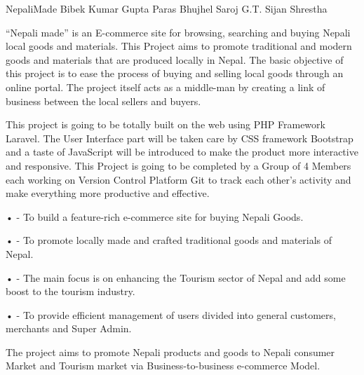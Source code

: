  \begin{conf-abstract}[]
 {NepaliMade}
 {Bibek Kumar Gupta
 	Paras Bhujhel
 	Saroj G.T.
 	Sijan Shrestha
 }
{}

“Nepali made” is an E-commerce site for browsing, searching and buying Nepali local goods and materials. This Project aims to promote traditional and modern goods and materials that are produced locally in Nepal. The basic objective of this project is to ease the process of buying and selling local goods through an online portal. The project itself acts as a middle-man by creating a link of business between the local sellers and buyers. 

This project is going to be totally built on the web using PHP Framework Laravel. The User Interface part will be taken care by CSS framework Bootstrap and a taste of JavaScript will be introduced to make the product more interactive and responsive. This Project is going to be completed by a Group of 4 Members each working on Version Control Platform Git to track each other’s activity and make everything more productive and effective. 

•    - To build a feature-rich e-commerce site for buying Nepali Goods.

•    - To promote locally made and crafted traditional goods and materials of Nepal.

•    - The main focus is on enhancing the Tourism sector of Nepal and add some boost to the tourism industry.

•    - To provide efficient management of users divided into general customers, merchants and Super Admin.

The project aims to promote Nepali products and goods to Nepali consumer Market and Tourism market via Business-to-business e-commerce Model.
\end{conf-abstract}
